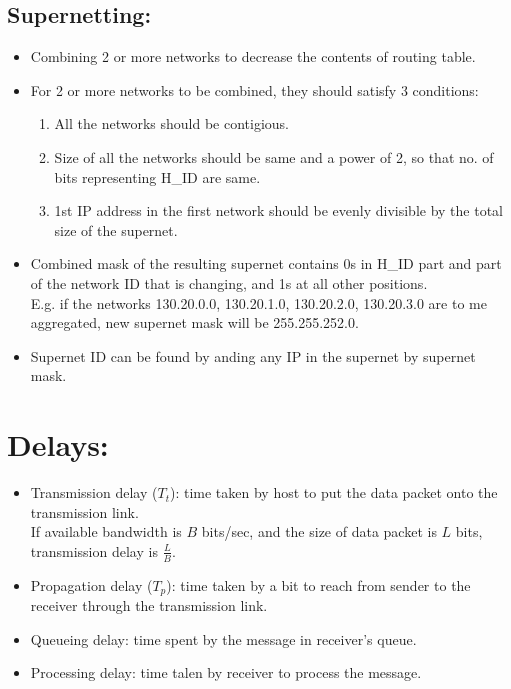 \documentclass{article}
\begin{document}
	\subsection{Supernetting:}
	\begin{itemize}
		\item Combining 2 or more networks to decrease the contents of routing table.
		\item For 2 or more networks to be combined, they should satisfy 3 conditions:\begin{enumerate}
			\item All the networks should be contigious.
			\item Size of all the networks should be same and a power of 2, so that no. of bits representing H\_ID are same.
			\item 1st IP address in the first network should be evenly divisible by the total size of the supernet.
		\end{enumerate}
		\item Combined mask of the resulting supernet contains 0s in H\_ID part and part of the network ID that is changing, and 1s at all other positions.\\
		E.g. if the networks 130.20.0.0, 130.20.1.0, 130.20.2.0, 130.20.3.0 are to me aggregated, new supernet mask will be 255.255.252.0.
		\item Supernet ID can be found by anding any IP in the supernet by supernet mask.
	\end{itemize}

\section{Delays:}
\begin{itemize}
	\item Transmission delay ($T_t$): time taken by host to put the data packet onto the transmission link.\\
		If available bandwidth is $B$ bits/sec, and the size of data packet is $L$ bits, transmission delay is $\frac{L}{B}$.
	\item Propagation delay ($T_p$): time taken by a bit to reach from sender to the receiver through the transmission link.
	\item Queueing delay: time spent by the message in receiver's queue.
	\item Processing delay: time talen by receiver to process the message.
\end{itemize}
\end{document}
